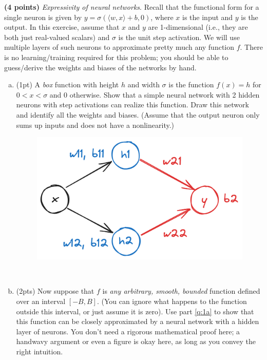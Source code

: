 \noindent {}
\textbf{(4 points)} \textit{Expressivity of neural networks}. Recall that the functional form for a
single neuron is given by $y = \sigma(\langle w, x\rangle + b, 0)$, where $x$ is the input and $y$ is the output. In this exercise, assume that $x$ and $y$ are 1-dimensional (i.e., they are both just real-valued scalars) and $\sigma$ is the unit step activation. We will use multiple layers of such neurons to approximate pretty much any function $f$. There is no learning/training required for this problem; you should be able to guess/derive the weights and biases of the networks by hand.

\begin{enumerate}[a.]
    \item \label{q:1a} 
    (1pt) A \textit{box} function with height $h$ and width $\sigma$ is the function $f(x) = h$ for $0 < x < \sigma$ and 0 otherwise. Show that a simple neural network with 2 hidden neurons with step activations can realize this function. Draw this network and identify all the weights and biases. (Assume that the output neuron only sums up inputs and does not have a nonlinearity.)
    \vspace{-10pt}
    \begin{figure}[!h]
        \centering
        \includegraphics[width=0.4\linewidth]{HWs//HW1//figures/1.png}
    \end{figure} \\
    \item \label{q:1b} 
    (2pts) Now suppose that $f$ is \textit{any arbitrary, smooth, bounded} function defined over an interval $[-B, B]$. (You can ignore what happens to the function outside this interval, or just assume it is zero). Use part \ref{q:1a} to show that this function can be closely approximated by a neural network with a hidden layer of neurons. You don’t need a rigorous mathematical proof here; a handwavy argument or even a figure is okay here, as long as you convey the right intuition. \\

\end{enumerate}
